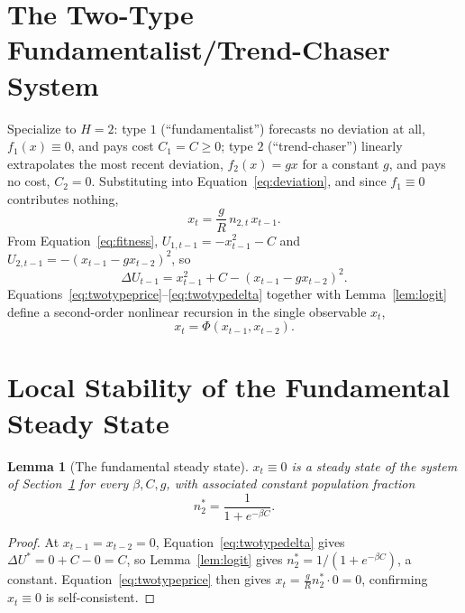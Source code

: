 \documentclass[11pt]{article}
\newtheorem{lemma}{Lemma}
\theoremstyle{remark}
\theoremstyle{definition}
\begin{document}
\section{The Two-Type Fundamentalist/Trend-Chaser System}
\label{sec:twotype}

Specialize to $H=2$: type $1$ (``fundamentalist'') forecasts no deviation at all, $f_1(x)\equiv0$, and pays cost $C_1=C\ge0$; type $2$ (``trend-chaser'') linearly extrapolates the most recent deviation, $f_2(x)=gx$ for a constant $g$, and pays no cost, $C_2=0$. Substituting into Equation~\eqref{eq:deviation}, and since $f_1\equiv0$ contributes nothing,
\begin{equation}
x_t = \frac{g}{R}\,n_{2,t}\,x_{t-1}.
\label{eq:twotypeprice}
\end{equation}
From Equation~\eqref{eq:fitness}, $U_{1,t-1}=-x_{t-1}^2-C$ and $U_{2,t-1}=-(x_{t-1}-gx_{t-2})^2$, so
\begin{equation}
\Delta U_{t-1} = x_{t-1}^2+C-(x_{t-1}-gx_{t-2})^2.
\label{eq:twotypedelta}
\end{equation}
Equations~\eqref{eq:twotypeprice}--\eqref{eq:twotypedelta} together with Lemma~\ref{lem:logit} define a second-order nonlinear recursion in the single observable $x_t$,
\begin{equation*}
x_t=\Phi(x_{t-1},x_{t-2}).
\end{equation*}

\section{Local Stability of the Fundamental Steady State}
\label{sec:stability}

\begin{lemma}[The fundamental steady state]
\label{lem:steadystate}
$x_t\equiv0$ is a steady state of the system of Section~\ref{sec:twotype} for every $\beta,C,g$, with associated constant population fraction
\begin{equation}
n_2^{*} = \frac{1}{1+e^{-\beta C}}.
\label{eq:nstar}
\end{equation}
\end{lemma}
\begin{proof}
At $x_{t-1}=x_{t-2}=0$, Equation~\eqref{eq:twotypedelta} gives $\Delta U^{*}=0+C-0=C$, so Lemma~\ref{lem:logit} gives $n_2^{*}=1/(1+e^{-\beta C})$, a constant. Equation~\eqref{eq:twotypeprice} then gives $x_t = \tfrac{g}{R}n_2^{*}\cdot 0 = 0$, confirming $x_t\equiv0$ is self-consistent.
\end{proof}
\end{document}
